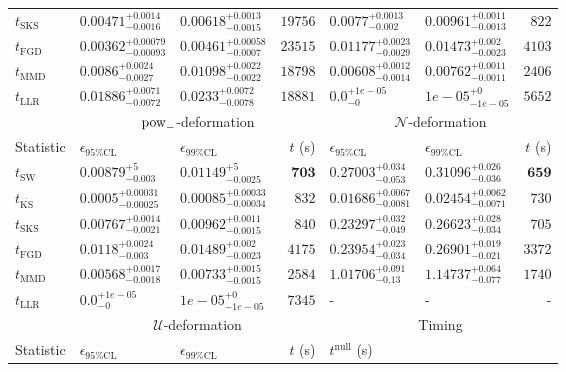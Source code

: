 \begin{tabular}{l|llr|llr}
	$t_{\mathrm{SKS}}$ & $0.00471_{-0.0016}^{+0.0014}$ & $0.00618_{-0.0015}^{+0.0013}$ & $19756$ & $0.0077_{-0.002}^{+0.0013}$ & $0.00961_{-0.0013}^{+0.0011}$ & $822$ \\
	$t_{\mathrm{FGD}}$ & ${\mathbf{0.00362_{-0.00093}^{+0.00079}}}$ & ${\mathbf{0.00461_{-0.0007}^{+0.00058}}}$ & $23515$ & $0.01177_{-0.0029}^{+0.0023}$ & $0.01473_{-0.0023}^{+0.002}$ & $4103$ \\
	$t_{\mathrm{MMD}}$ & $0.0086_{-0.0027}^{+0.0024}$ & $0.01098_{-0.0022}^{+0.0022}$ & $18798$ & $0.00608_{-0.0014}^{+0.0012}$ & $0.00762_{-0.0011}^{+0.0011}$ & $2406$ \\
	$t_{\mathrm{LLR}}$ & $0.01886_{-0.0072}^{+0.0071}$ & $0.0233_{-0.0078}^{+0.0072}$ & $18881$ & $0.0_{-0}^{+1e-05}$ & $1e-05_{-1e-05}^{+0}$ & $5652$ \\
	\toprule
	\multicolumn{1}{c}{} & \multicolumn{3}{c}{$\rm{pow}_{-}$-deformation} & \multicolumn{3}{c}{$\mathcal{N}$-deformation} \\
	Statistic & $\epsilon_{95\%\mathrm{CL}}$ & $\epsilon_{99\%\mathrm{CL}}$ & $t$ (s) & $\epsilon_{95\%\mathrm{CL}}$ & $\epsilon_{99\%\mathrm{CL}}$ & $t$ (s) \\
	\midrule
	$t_{\mathrm{SW}}$ & $0.00879_{-0.003}^{+5}$ & $0.01149_{-0.0025}^{+5}$ & ${\mathbf{703}}$ & $0.27003_{-0.053}^{+0.034}$ & $0.31096_{-0.036}^{+0.026}$ & ${\mathbf{659}}$ \\
	$t_{\overline{\mathrm{KS}}}$ & ${\mathbf{0.0005_{-0.00025}^{+0.00031}}}$ & ${\mathbf{0.00085_{-0.00034}^{+0.00033}}}$ & $832$ & ${\mathbf{0.01686_{-0.0081}^{+0.0067}}}$ & ${\mathbf{0.02454_{-0.0071}^{+0.0062}}}$ & $730$ \\
	$t_{\mathrm{SKS}}$ & $0.00767_{-0.0021}^{+0.0014}$ & $0.00962_{-0.0015}^{+0.0011}$ & $840$ & $0.23297_{-0.049}^{+0.032}$ & $0.26623_{-0.034}^{+0.028}$ & $705$ \\
	$t_{\mathrm{FGD}}$ & $0.0118_{-0.003}^{+0.0024}$ & $0.01489_{-0.0023}^{+0.002}$ & $4175$ & $0.23954_{-0.034}^{+0.023}$ & $0.26901_{-0.021}^{+0.019}$ & $3372$ \\
	$t_{\mathrm{MMD}}$ & $0.00568_{-0.0018}^{+0.0017}$ & $0.00733_{-0.0015}^{+0.0015}$ & $2584$ & $1.01706_{-0.13}^{+0.091}$ & $1.14737_{-0.077}^{+0.064}$ & $1740$ \\
	$t_{\mathrm{LLR}}$ & $0.0_{-0}^{+1e-05}$ & $1e-05_{-1e-05}^{+0}$ & $7345$ & - & - & - \\
	\toprule
	\multicolumn{1}{c}{} & \multicolumn{3}{c}{$\mathcal{U}$-deformation} & \multicolumn{3}{c}{Timing} \\
	Statistic & $\epsilon_{95\%\mathrm{CL}}$ & $\epsilon_{99\%\mathrm{CL}}$ & $t$ (s) & $t^{\mathrm{null}}$ (s) \\

\end{tabular}
